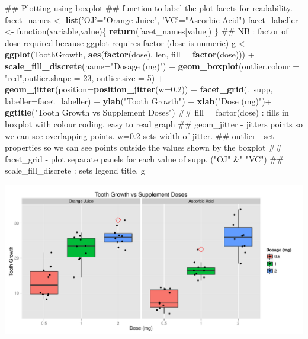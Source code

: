 \documentclass[]{article}
\newenvironment{Shaded}{\begin{snugshade}}{\end{snugshade}}
\newcommand{\KeywordTok}[1]{\textcolor[rgb]{0.13,0.29,0.53}{\textbf{{#1}}}}
\newcommand{\DataTypeTok}[1]{\textcolor[rgb]{0.13,0.29,0.53}{{#1}}}
\newcommand{\DecValTok}[1]{\textcolor[rgb]{0.00,0.00,0.81}{{#1}}}
\newcommand{\FloatTok}[1]{\textcolor[rgb]{0.00,0.00,0.81}{{#1}}}
\newcommand{\StringTok}[1]{\textcolor[rgb]{0.31,0.60,0.02}{{#1}}}
\newcommand{\NormalTok}[1]{{#1}}
\begin{document}
\begin{Shaded}
\begin{Highlighting}[]
\NormalTok{## Plotting using boxplot}
\NormalTok{## function to label the plot facets for readability.}
\NormalTok{facet_names <-}\StringTok{ }\KeywordTok{list}\NormalTok{(}\StringTok{'OJ'}\NormalTok{=}\StringTok{"Orange Juice"}\NormalTok{, }\StringTok{'VC'}\NormalTok{=}\StringTok{"Ascorbic Acid"}\NormalTok{)}
\NormalTok{facet_labeller <-}\StringTok{ }\NormalTok{function(variable,value)\{ }\KeywordTok{return}\NormalTok{(facet_names[value]) \}}
\NormalTok{## NB : factor of dose required because ggplot requires factor (dose is numeric)}
\NormalTok{g <-}\StringTok{ }\KeywordTok{ggplot}\NormalTok{(ToothGrowth, }\KeywordTok{aes}\NormalTok{(}\KeywordTok{factor}\NormalTok{(dose), len, }\DataTypeTok{fill =} \KeywordTok{factor}\NormalTok{(dose))) +}
\KeywordTok{scale_fill_discrete}\NormalTok{(}\DataTypeTok{name=}\StringTok{"Dosage (mg)"}\NormalTok{) +}\StringTok{ }
\KeywordTok{geom_boxplot}\NormalTok{(}\DataTypeTok{outlier.colour =} \StringTok{"red"}\NormalTok{,}\DataTypeTok{outlier.shape =} \DecValTok{23}\NormalTok{, }\DataTypeTok{outlier.size =} \DecValTok{5}\NormalTok{) +}
\KeywordTok{geom_jitter}\NormalTok{(}\DataTypeTok{position=}\KeywordTok{position_jitter}\NormalTok{(}\DataTypeTok{w=}\FloatTok{0.2}\NormalTok{)) +}
\KeywordTok{facet_grid}\NormalTok{(.~supp, }\DataTypeTok{labeller=}\NormalTok{facet_labeller) +}
\KeywordTok{ylab}\NormalTok{(}\StringTok{"Tooth Growth"}\NormalTok{) +}
\KeywordTok{xlab}\NormalTok{(}\StringTok{"Dose (mg)"}\NormalTok{)+}
\KeywordTok{ggtitle}\NormalTok{(}\StringTok{"Tooth Growth vs Supplement Doses"}\NormalTok{)}
\NormalTok{## fill = factor(dose) : fills in boxplot with colour coding, easy to read graph}
\NormalTok{## geom_jitter - jitters points so we can see overlapping points. w=0.2 sets width of jitter.}
\NormalTok{## outlier - set properties so we can see points outside the values shown by the boxplot }
\NormalTok{## facet_grid - plot separate panels for each value of supp. ("OJ" &" "VC")}
\NormalTok{## scale_fill_discrete : sets legend title.}
\NormalTok{g  }
\end{Highlighting}
\end{Shaded}

\includegraphics{BMT_project2_for_submission_20-04-2015_files/figure-latex/Plot for analysis-1.pdf}
\end{document}
